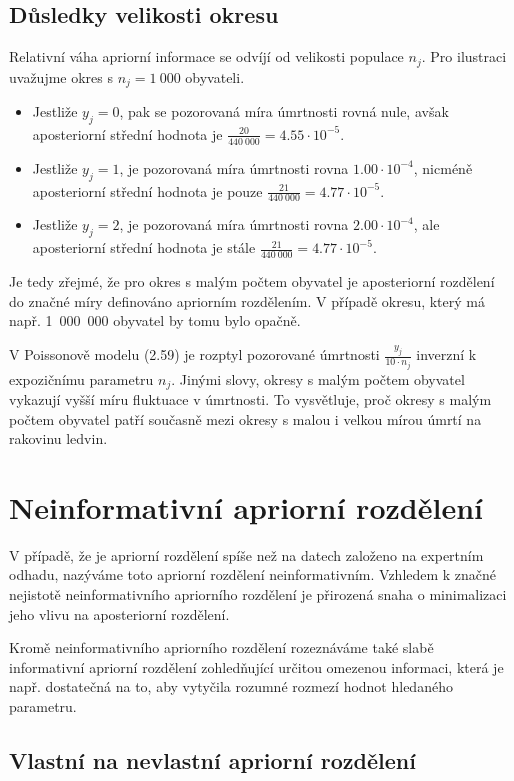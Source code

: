 \subsection{Důsledky velikosti okresu}

Relativní váha apriorní informace se odvíjí od velikosti populace $n_j$. Pro ilustraci uvažujme okres s $n_j = 1~000$ obyvateli.
\begin{itemize}
\item Jestliže $y_j = 0$, pak se pozorovaná míra úmrtnosti rovná nule, avšak aposteriorní střední hodnota je $\frac{20}{440~000} = 4.55 \cdot 10^{-5}$.
\item Jestliže $y_j = 1$, je pozorovaná míra úmrtnosti rovna $1.00 \cdot 10^{-4}$, nicméně aposteriorní střední hodnota je pouze $\frac{21}{440~000} = 4.77 \cdot 10^{-5}$.
\item Jestliže $y_j = 2$, je pozorovaná míra úmrtnosti rovna $2.00 \cdot 10^{-4}$, ale aposteriorní střední hodnota je stále $\frac{21}{440~000} = 4.77 \cdot 10^{-5}$.
\end{itemize}
Je tedy zřejmé, že pro okres s malým počtem obyvatel je aposteriorní rozdělení do značné míry definováno apriorním rozdělením. V případě okresu, který má např. 1~000~000 obyvatel by tomu bylo opačně.

V Poissonově modelu (2.59) je rozptyl pozorované úmrtnosti $\frac{y_j}{10 \cdot n_j}$ inverzní k expozičnímu parametru $n_j$. Jinými slovy, okresy s malým počtem obyvatel vykazují vyšší míru fluktuace v úmrtnosti. To vysvětluje, proč okresy s malým počtem obyvatel patří současně mezi okresy s malou i velkou mírou úmrtí na rakovinu ledvin.

\section{Neinformativní apriorní rozdělení}

V případě, že je apriorní rozdělení spíše než na datech založeno na expertním odhadu, nazýváme toto apriorní rozdělení neinformativním. Vzhledem k značné nejistotě neinformativního apriorního rozdělení je přirozená snaha o minimalizaci jeho vlivu na aposteriorní rozdělení.

Kromě neinformativního apriorního rozdělení rozeznáváme také slabě informativní apriorní rozdělení zohledňující určitou omezenou informaci, která je např. dostatečná na to, aby vytyčila rozumné rozmezí hodnot hledaného parametru.

\subsection{Vlastní na nevlastní apriorní rozdělení}

